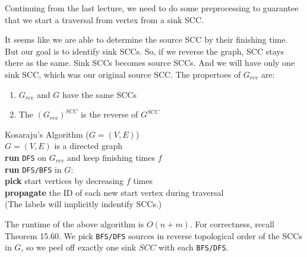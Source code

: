 \documentclass[twoside]{article}
\newcommand{\pc}[1]{\mbox{\textbf{#1}}} %
\begin{document}
Continuing from the last lecture, we need to do some preprocessing to guarantee that we start a traversal from vertex from a sink SCC. 

It seems like we are able to determine the source SCC by their finishing time. But our goal is to identify sink SCCs. So, if we reverse the graph, SCC stays there as the same. Sink SCCs becomes source SCCs. And we will have only one sink SCC, which was our original source SCC. The propertoes of $G_{rev}$ are: 
\begin{enumerate}
	\item $G_{rev}$ and $G$ have the same SCCs
	\item The $(G_{rev})^{SCC}$ is the reverse of $G^{SCC}$
\end{enumerate}
\begin{algorithme}
	Kosaraju's Algorithm ($G = (V, E)$)\\
	$G = (V, E)$ is a directed graph\\
	\>\pc{run} \texttt{DFS} on $G_{rev}$ and keep finishing times $f$\\
	\>\pc{run} \texttt{DFS/BFS} in $G$:\\
	\>\>\pc{pick} start vertices by decreasing $f$ times\\
	\>\>\pc{propagate} the ID of each new start vertex during traversal\\
	(The labels will implicitly indentify SCCs.)
\end{algorithme}
The runtime of the above algorithm is $O(n+m)$. For correctness, recall Theorem 15.60. We pick \texttt{BFS/DFS} sources in reverse topological order of the SCCs in $G$, so we peel off exactly one sink $SCC$ with each \texttt{BFS/DFS}. 
\end{document}
